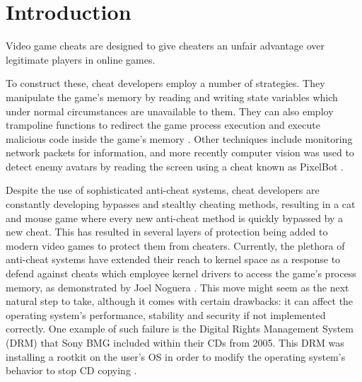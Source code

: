 \section{Introduction}

Video game cheats are designed to give cheaters an unfair advantage over legitimate players in online games. 

To construct these, cheat developers employ a number of strategies. They manipulate the game's memory by reading and writing state variables which under normal circumstances are unavailable to them. They can also employ trampoline functions to redirect the game process execution and execute malicious code inside the game's memory \cite{FengStealthMeasurements}. Other techniques include monitoring network packets for information, and more recently computer vision was used to detect enemy avatars by reading the screen using a cheat known as PixelBot \cite{pixelbot}. 

Despite the use of sophisticated anti-cheat systems, cheat developers are constantly developing bypasses and stealthy cheating methods, resulting in a cat and mouse game where every new anti-cheat method is quickly bypassed by a new cheat. This has resulted in several layers of protection being added to modern video games to protect them from cheaters. Currently, the plethora of anti-cheat systems have extended their reach to kernel space as a response to defend against cheats which employee kernel drivers to access the game's process memory, as demonstrated by Joel Noguera \cite{unveilingUndergroundWorldAntiCheats}. This move might seem as the next natural step to take, although it comes with certain drawbacks: it can affect the operating system's performance, stability and security if not implemented correctly. One example of such failure is the Digital Rights Management System (DRM) that Sony BMG included within their CDs from 2005. This DRM was installing a rootkit on the user's OS in order to modify the operating system's behavior to stop CD copying  \cite{halderman2006SonyRootkit}.

